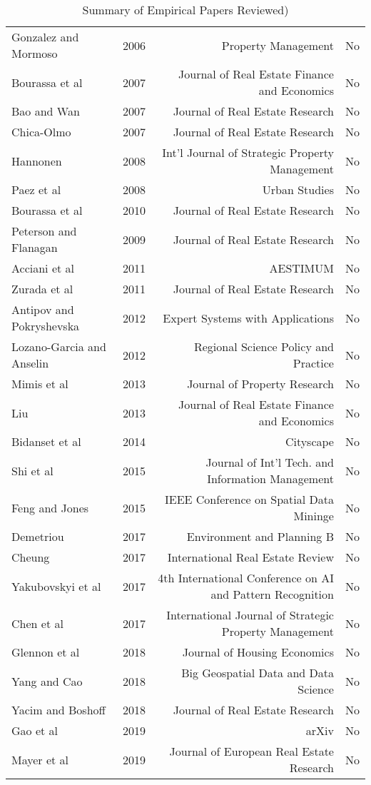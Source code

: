 \documentclass[colTwo]{format}
\theoremstyle{definition}
\begin{document}
\begin{table}[h!]
\begin{tabular}{|l|l|r|c|}
Gonzalez and Mormoso & 2006 & Property Management & No \\
Bourassa et al & 2007 & Journal of Real Estate Finance and Economics & No \\
Bao and Wan & 2007 & Journal of Real Estate Research & No \\
Chica-Olmo & 2007 & Journal of Real Estate Research & No \\
Hannonen & 2008 & Int'l Journal of Strategic Property Management & No \\
Paez et al & 2008 & Urban Studies & No \\
Bourassa et al & 2010 & Journal of Real Estate Research & No \\
Peterson and Flanagan & 2009 & Journal of Real Estate Research & No \\
Acciani et al & 2011 & AESTIMUM & No \\
Zurada et al & 2011 & Journal of Real Estate Research & No \\
Antipov and Pokryshevska & 2012 & Expert Systems with Applications & No \\
Lozano-Garcia and Anselin & 2012 & Regional Science Policy and Practice & No \\
Mimis et al & 2013 & Journal of Property Research & No \\
Liu & 2013 & Journal of Real Estate Finance and Economics & No \\
Bidanset et al & 2014 & Cityscape & No \\
Shi et al & 2015 & Journal of Int'l Tech. and Information Management & No \\
Feng and Jones & 2015 & IEEE Conference on Spatial Data Mininge & No \\
Demetriou & 2017 & Environment and Planning B & No \\
Cheung & 2017 & International Real Estate Review & No \\
Yakubovskyi et al & 2017 & 4th International Conference on AI and Pattern Recognition & No \\
Chen et al & 2017 & International Journal of Strategic Property Management & No \\
Glennon et al  & 2018 & Journal of Housing Economics & No \\
Yang and Cao & 2018 & Big Geospatial Data and Data Science & No \\
Yacim and Boshoff & 2018 & Journal of Real Estate Research & No \\
Gao et al & 2019 & arXiv & No \\
Mayer et al & 2019 & Journal of European Real Estate Research & No \\
\hline
\end{tabular}
\caption{Summary of Empirical Papers Reviewed)}
\label{table:A1}
\end{table}
\end{document}

